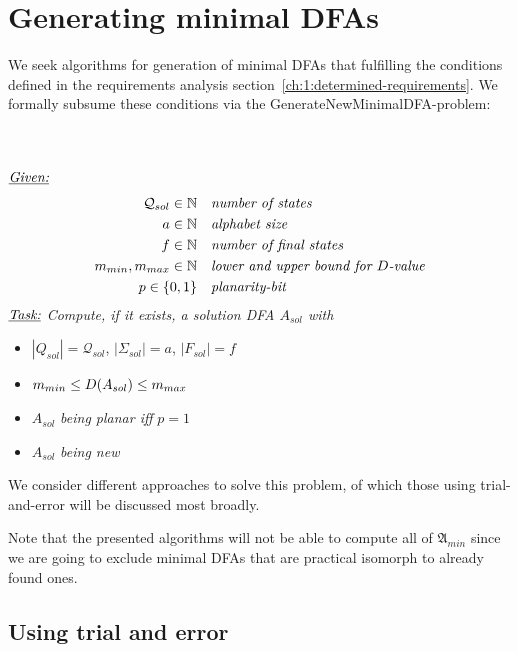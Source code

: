 
\chapter{Generating minimal DFAs} \label{ch:2}

We seek algorithms for generation of minimal DFAs that fulfilling the conditions defined in the requirements analysis section~\ref{ch:1:determined-requirements}. We formally subsume these conditions via the GenerateNewMinimalDFA-problem:
\begin{definition}[GenerateNewMinimalDFA] $ $ \\
	$ $ \vspace{-0.4cm} \\
	\noindent $\underline{\emph{Given:}}$
	\vspace{-0.5cm}
	\begin{align*}
	\mathcal{Q}_{sol} \in \mathbb{N}\ \ \ & \emph{number of states} \\
	a \in \mathbb{N}\ \ \ & \emph{alphabet size} \\
	f \in \mathbb{N}\ \ \ & \emph{number of final states} \\
	m_{min}, m_{max} \in \mathbb{N}\ \ \ & \emph{lower and upper bound for $D$-value} \\
	p \in \{0,1\}\ \ \ & \emph{planarity-bit}
	\end{align*}
	\noindent $\underline{\emph{Task:}}$ \emph{Compute, if it exists, a solution DFA $A_{sol}$ with}
	\begin{itemize}
		\item $|Q_{sol}|=\mathcal{Q}_{sol}$, $|\Sigma_{sol}|=a$, $|F_{sol}|=f$
		\item $m_{min} \le D(A_{sol}) \le m_{max}$
		\item $A_{sol}$ \emph{being planar iff} $p = 1$
		\item $A_{sol}$ \emph{being new}
	\end{itemize}
\end{definition}
\noindent We consider different approaches to solve this problem, of which those using trial-and-error will be discussed most broadly.

Note that the presented algorithms will not be able to compute all of $\mathfrak{A}_{min}$ since we are going to exclude minimal DFAs that are practical isomorph to already found ones.

\section{Using trial and error}

